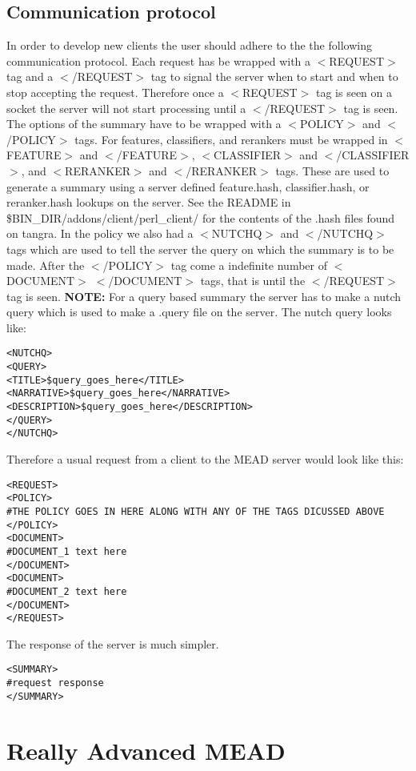 \documentclass[10pt]{article}
\begin{document}
\subsection{Communication protocol}
In order to develop new clients the user should adhere to the the following communication protocol.
Each request has be wrapped with a $<$REQUEST$>$ tag and a $<$/REQUEST$>$ tag to signal the server when to start and when to stop accepting the request.
Therefore once a $<$REQUEST$>$ tag is seen on a socket the server will not start processing until a $<$/REQUEST$>$ tag is seen.
The options of the summary have to be  wrapped with a $<$POLICY$>$ and $<$/POLICY$>$ tags.
For features, classifiers, and rerankers must be wrapped in $<$FEATURE$>$ and $<$/FEATURE$>$, $<$CLASSIFIER$>$ and $<$/CLASSIFIER$>$, and $<$RERANKER$>$ and $<$/RERANKER$>$ tags.
These are used to generate a summary using a server defined feature.hash, classifier.hash, or reranker.hash lookups on the server.
See the README in \$BIN\_DIR/addons/client/perl\_client/ for the contents of the .hash files found on tangra.
In the policy we also had a $<$NUTCHQ$>$ and $<$/NUTCHQ$>$ tags which are used to tell the server the query on which the summary is to be made.
After the $<$/POLICY$>$ tag come a indefinite number of $<$DOCUMENT$>$ $<$/DOCUMENT$>$ tags, that is until the $<$/REQUEST$>$ tag is seen.
{\bf NOTE:}
For a query based summary the server has to make a nutch query which is used to make a .query file on the server.  The nutch query looks like:
\begin{verbatim}
<NUTCHQ>
<QUERY>
<TITLE>$query_goes_here</TITLE>
<NARRATIVE>$query_goes_here</NARRATIVE>
<DESCRIPTION>$query_goes_here</DESCRIPTION>
</QUERY>
</NUTCHQ>
\end{verbatim}
Therefore a usual request from a client to the MEAD server would look like this:
\begin{verbatim}
<REQUEST>
<POLICY>
#THE POLICY GOES IN HERE ALONG WITH ANY OF THE TAGS DICUSSED ABOVE
</POLICY>
<DOCUMENT>
#DOCUMENT_1 text here
</DOCUMENT>
<DOCUMENT>
#DOCUMENT_2 text here
</DOCUMENT>
</REQUEST>
\end{verbatim}
The response of the server is much simpler.
\begin{verbatim}
<SUMMARY>
#request response
</SUMMARY>
\end{verbatim}



\section{Really Advanced MEAD}
\end{document}
